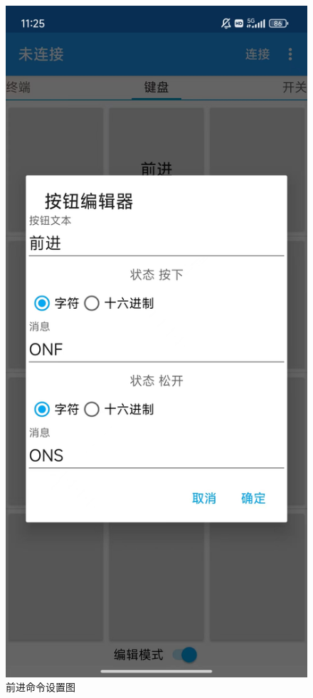\begin{figure}[htbp]
	\centering
	\begin{minipage}{0.49\linewidth}
		\centering
		\includegraphics[width=0.6\linewidth]{figures/前进命令设置.jpg}
		\caption{前进命令设置图}
		\label{前进命令设置}%
	\end{minipage}
	\begin{minipage}{0.49\linewidth}
		\centering

\end{minipage}
\end{figure}
